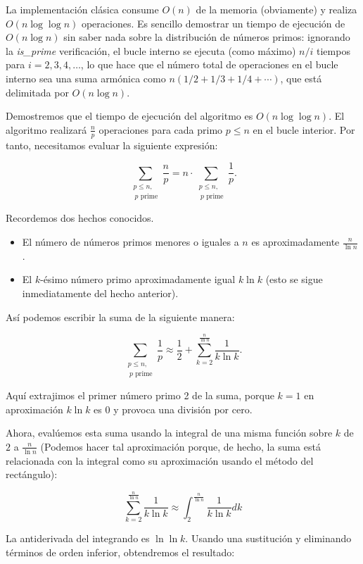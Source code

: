 La implementación clásica consume $O(n)$ de la memoria (obviamente) y realiza $O(n \log \log n)$
operaciones. Es sencillo demostrar un tiempo de ejecución de $O(n \log n)$ sin saber nada sobre la 
distribución de números primos: ignorando la \emph{is\_prime} verificación, el bucle interno se 
ejecuta (como máximo) $n/i$ tiempos para $i = 2, 3, 4, \dots $, lo que hace que el número total de 
operaciones en el bucle interno sea una suma armónica como $n(1/2 + 1/3 + 1/4 + \cdots)$, que está 
delimitada por $O(n \log n)$.

Demostremos que el tiempo de ejecución del algoritmo es $O(n \log \log n)$. El algoritmo realizará
$\frac{n}{p}$ operaciones para cada primo $p \le n$ en el bucle interior. Por tanto, necesitamos 
evaluar la siguiente expresión:

$$\sum_{\substack{p \le n, \\\ p \text{ prime}}} \frac n p = n \cdot \sum_{\substack{p \le n, \\\ p \text{ prime}}} \frac 1 p.$$

Recordemos dos hechos conocidos.

\begin{itemize}
	\item El número de números primos menores o iguales a $n$ es aproximadamente $\frac n {\ln n}$.
	\item El $k$-ésimo número primo aproximadamente igual $k\ln k$ (esto se sigue inmediatamente del hecho anterior).
\end{itemize}

Así podemos escribir la suma de la siguiente manera:

$$\sum_{\substack{p \le n, \\\ p \text{ prime}}} \frac 1 p \approx \frac 1 2 + \sum_{k = 2}^{\frac n {\ln n}} \frac 1 {k \ln k}.$$

Aquí extrajimos el primer número primo 2 de la suma, porque $k = 1$ en aproximación $k \ln k$ es $0$ y provoca una división por cero.

Ahora, evalúemos esta suma usando la integral de una misma función sobre $k$ de $2$ a $\frac n {\ln n}$ (Podemos hacer tal aproximación porque, de hecho, la suma está relacionada con la integral como su aproximación usando el método del rectángulo):

$$\sum_{k = 2}^{\frac n {\ln n}} \frac 1 {k \ln k} \approx \int_2^{\frac n {\ln n}} \frac 1 {k \ln k} dk$$

La antiderivada del integrando es $\ln \ln k$. Usando una sustitución y eliminando términos de orden inferior, obtendremos el resultado:

